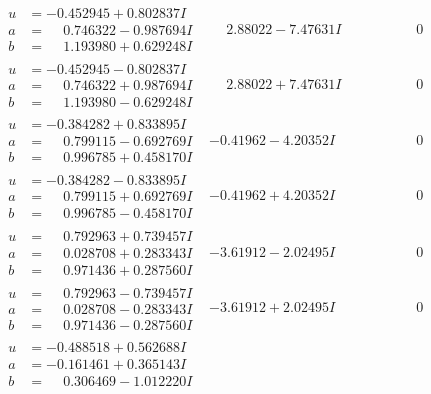 \documentclass[1p]{elsarticle_modified}
\theoremstyle{definition}
\begin{document}
$$\begin{array}{c|c|c}
\begin{aligned}
u &= -0.452945 + 0.802837 I \\
a &= \phantom{-}0.746322 - 0.987694 I \\
b &= \phantom{-}1.193980 + 0.629248 I\end{aligned}
 & \phantom{-}2.88022 - 7.47631 I & \phantom{-0.000000 } 0 \\ \hline\begin{aligned}
u &= -0.452945 - 0.802837 I \\
a &= \phantom{-}0.746322 + 0.987694 I \\
b &= \phantom{-}1.193980 - 0.629248 I\end{aligned}
 & \phantom{-}2.88022 + 7.47631 I & \phantom{-0.000000 } 0 \\ \hline\begin{aligned}
u &= -0.384282 + 0.833895 I \\
a &= \phantom{-}0.799115 - 0.692769 I \\
b &= \phantom{-}0.996785 + 0.458170 I\end{aligned}
 & -0.41962 - 4.20352 I & \phantom{-0.000000 } 0 \\ \hline\begin{aligned}
u &= -0.384282 - 0.833895 I \\
a &= \phantom{-}0.799115 + 0.692769 I \\
b &= \phantom{-}0.996785 - 0.458170 I\end{aligned}
 & -0.41962 + 4.20352 I & \phantom{-0.000000 } 0 \\ \hline\begin{aligned}
u &= \phantom{-}0.792963 + 0.739457 I \\
a &= \phantom{-}0.028708 + 0.283343 I \\
b &= \phantom{-}0.971436 + 0.287560 I\end{aligned}
 & -3.61912 - 2.02495 I & \phantom{-0.000000 } 0 \\ \hline\begin{aligned}
u &= \phantom{-}0.792963 - 0.739457 I \\
a &= \phantom{-}0.028708 - 0.283343 I \\
b &= \phantom{-}0.971436 - 0.287560 I\end{aligned}
 & -3.61912 + 2.02495 I & \phantom{-0.000000 } 0 \\ \hline\begin{aligned}
u &= -0.488518 + 0.562688 I \\
a &= -0.161461 + 0.365143 I \\
b &= \phantom{-}0.306469 - 1.012220 I\end{aligned}

\end{array}$$
\end{document}

